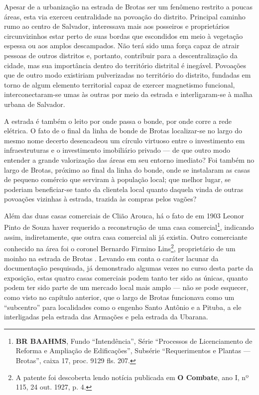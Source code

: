 
Apesar de a urbanização na estrada de Brotas ser um fenômeno restrito a poucas áreas, esta via exerceu centralidade na povoação do distrito. Principal caminho rumo ao centro de Salvador, interessava mais aos posseiros e proprietários circunvizinhos estar perto de suas bordas que escondidos em meio à vegetação espessa ou aos amplos descampados. Não terá sido uma força capaz de atrair pessoas de outros distritos e, portanto, contribuir para a descentralização da cidade, mas sua importância dentro do território distrital é inegável. Povoações que de outro modo existiriam pulverizadas no território do distrito, fundadas em torno de algum elemento territorial capaz de exercer magnetismo funcional, interconectaram-se umas às outras por meio da estrada e interligaram-se à malha urbana de Salvador.

A estrada é também o leito por onde passa o bonde, por onde corre a rede elétrica. O fato de o final da linha de bonde de Brotas localizar-se no largo do mesmo nome decerto desencadeou um círculo virtuoso entre o investimento em infraestruturas e o investimento imobiliário privado --- de que outro modo entender a grande valorização das áreas em seu entorno imediato? Foi também no largo de Brotas, próximo ao final da linha do bonde, onde se instalaram as casas de pequeno comércio que serviram à população local; que melhor lugar, se poderiam beneficiar-se tanto da clientela local quanto daquela vinda de outras povoações vizinhas à estrada, trazida às compras pelos vagões?


Além das duas casas comerciais de Clião Arouca, há o fato de em 1903 Leonor Pinto de Souza haver requerido a reconstrução de uma casa comercial\footnote{\textbf{BR BAAHMS}, Fundo ``Intendência'', Série ``Processos de Licenciamento de Reforma e Ampliação de Edificações'', Subsérie ``Requerimentos e Plantas --- Brotas'', caixa 17, proc. 9129 fls. 207.}, indicando assim, indiretamente, que outra casa comercial ali já existia. Outro comerciante conhecido na área foi o coronel Bernardo Firmino Lins\footnote{A patente foi descoberta lendo notícia publicada em \textbf{O Combate}, ano I, nº 115, 24 out. 1927, p. 4.}, proprietário de um moinho na estrada de Brotas \cite[p.~433]{reis_almanak_1898}. Levando em conta o caráter lacunar da documentação pesquisada, já demonstrado algumas vezes no curso desta parte da exposição, estas quatro casas comerciais podem tanto ter sido as únicas, quanto podem ter sido parte de um mercado local mais amplo --- não se pode esquecer, como visto no capítulo anterior, que o largo de Brotas funcionava como um ``subcentro'' para localidades como o engenho Santo Antônio e a Pituba, a ele interligadas pela estrada das Armações e pela estrada da Ubarana.

